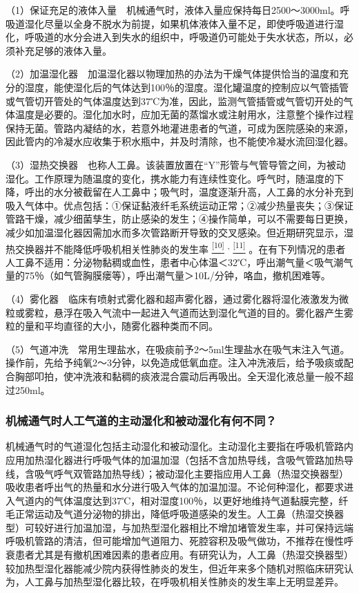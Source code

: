 （1）保证充足的液体入量　机械通气时，液体入量应保持每日2500～3000ml。呼吸道湿化尽量以全身不脱水为前提，如果机体液体入量不足，即使呼吸道进行湿化，呼吸道的水分会进入到失水的组织中，呼吸道仍可能处于失水状态，所以，必须补充足够的液体入量。

（2）加温湿化器　加温湿化器以物理加热的办法为干燥气体提供恰当的温度和充分的湿度，能使湿化后的气体达到100％的湿度。湿化罐温度的控制应以气管插管或气管切开管处的气体温度达到37℃为准，因此，监测气管插管或气管切开处的气体温度是必要的。湿化加水时，应加无菌的蒸馏水或注射用水，注意整个操作过程保持无菌。管路内凝结的水，若意外地灌进患者的气道，可成为医院感染的来源，因此管内的冷凝水应收集于积水瓶中，并及时清除，也不能使冷凝水流回湿化器。

（3）湿热交换器　也称人工鼻。该装置放置在“Y”形管与气管导管之间，为被动湿化。工作原理为随温度的变化，携水能力有连续性变化。呼气时，随温度的下降，呼出的水分被截留在人工鼻中；吸气时，温度逐渐升高，人工鼻的水分补充到吸入气体中。优点包括：①保证黏液纤毛系统运动正常；②减少热量丧失；③保证管路干燥，减少细菌孳生，防止感染的发生；④操作简单，可以不需要每日更换，减少如加温湿化器因需加水而多次管路断开导致的交叉感染。但近期研究显示，湿热交换器并不能降低呼吸机相关性肺炎的发生率
\protect\hyperlink{text00015.htmlux5cux23ch10-14}{\textsuperscript{{[}10{]}}}
\textsuperscript{,}
\protect\hyperlink{text00015.htmlux5cux23ch11-14}{\textsuperscript{{[}11{]}}}
。在有下列情况的患者人工鼻不适用：分泌物黏稠或血性，患者中心体温＜32℃，呼出潮气量＜吸气潮气量的75％（如气管胸膜瘘等），呼出潮气量＞10L/分钟，咯血，撤机困难等。

（4）雾化器　临床有喷射式雾化器和超声雾化器，通过雾化器将湿化液激发为微粒或雾粒，悬浮在吸入气流中一起进入气道而达到湿化气道的目的。雾化器产生雾粒的量和平均直径的大小，随雾化器种类而不同。

（5）气道冲洗　常用生理盐水，在吸痰前予2～5ml生理盐水在吸气末注入气道。操作前，先给予纯氧2～3分钟，以免造成低氧血症。注入冲洗液后，给予吸痰或配合胸部叩拍，使冲洗液和黏稠的痰液混合震动后再吸出。全天湿化液总量一般不超过250ml。

\subsubsection{机械通气时人工气道的主动湿化和被动湿化有何不同？}

机械通气时的气道湿化包括主动湿化和被动湿化。主动湿化主要指在呼吸机管路内应用加热湿化器进行呼吸气体的加温加湿（包括不含加热导线，含吸气管路加热导线，含吸气呼气双管路加热导线）；被动湿化主要指应用人工鼻（热湿交换器型）吸收患者呼出气的热量和水分进行吸入气体的加温加湿。不论何种湿化，都要求进入气道内的气体温度达到37℃，相对湿度100％，以更好地维持气道黏膜完整，纤毛正常运动及气道分泌物的排出，降低呼吸道感染的发生。人工鼻（热湿交换器型）可较好进行加温加湿，与加热型湿化器相比不增加堵管发生率，并可保持远端呼吸机管路的清洁，但可能增加气道阻力、死腔容积及吸气做功，不推荐在慢性呼衰患者尤其是有撤机困难因素的患者应用。有研究认为，人工鼻（热湿交换器型）较加热型湿化器能减少院内获得性肺炎的发生，但近年来多个随机对照临床研究认为，人工鼻与加热型湿化器比较，在呼吸机相关性肺炎的发生率上无明显差异。

